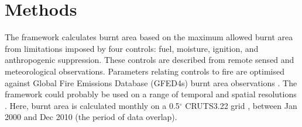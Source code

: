 \section{Methods}
The framework calculates burnt area based on the maximum allowed burnt area from limitations imposed by four controls: fuel, moisture, ignition, and anthropogenic suppression. These controls are described from remote sensed and meteorological observations. Parameters relating controls to fire are optimised against Global Fire Emissions Database (GFED4s) burnt area observations \citep{Giglio2013}.
The framework could probably be used on a range of temporal and spatial resolutions
.
Here, burnt area is calculated monthly on a 0.5$^{\circ}$ CRUTS3.22 grid \citep{harris2014cru}, between Jan 2000 and Dec 2010 (the period of data overlap).






